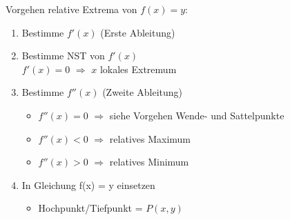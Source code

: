 \begin{KR}{Vorgehen relative Extrema} von $f(x) = y$:
    \begin{enumerate}
	\item Bestimme $f'(x)$ (Erste Ableitung)
	\item Bestimme NST von $f'(x)$\\
		$f'(x) = 0$ $ \Rightarrow$ $x$ lokales Extremum
	\item Bestimme $f''(x)$ (Zweite Ableitung)
		\begin{itemize}
			\item $f''(x) = 0$ $ \Rightarrow$ siehe Vorgehen Wende- und Sattelpunkte
			\item $f''(x) < 0$ $ \Rightarrow$ relatives Maximum
			\item $f''(x) > 0$ $ \Rightarrow$ relatives Minimum
		\end{itemize}
    \item In Gleichung f(x) = y einsetzen
        \begin{itemize}
            \item Hochpunkt/Tiefpunkt = $P(x, y)$
        \end{itemize}
\end{enumerate}
\end{KR}














































